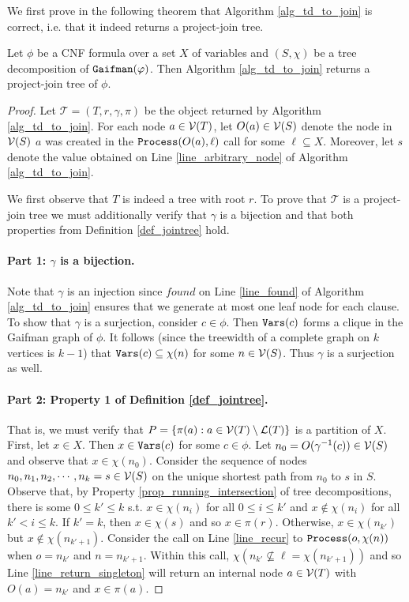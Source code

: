 We first prove in the following theorem that Algorithm \ref{alg_td_to_join} is correct, i.e. that it indeed returns a project-join tree. 
\begin{theorem}
\label{thm_td_to_join_correct}
	Let $\phi$ be a CNF formula over a set $X$ of variables and $(S, \chi)$ be a tree decomposition of $\texttt{\upshape Gaifman}(\varphi)$.
    Then Algorithm \ref{alg_td_to_join} returns a project-join tree of $\phi$.
\end{theorem}
\begin{proof}
Let $\mathcal{T} = (T, r, \gamma, \pi)$ be the object returned by Algorithm \ref{alg_td_to_join}. For each node $a \in \mathcal{V}(T)$, let $O(a) \in \mathcal{V}(S)$ denote the node in $\mathcal{V}(S)$ \st{} $a$ was created in the $\texttt{\upshape Process}(O(a), \ell)$ call for some $\ell \subseteq X$. Moreover, let $s$ denote the value obtained on Line \ref{line_arbitrary_node} of Algorithm \ref{alg_td_to_join}.

We first observe that $T$ is indeed a tree with root $r$. To prove that $\mathcal{T}$ is a project-join tree we must additionally verify that $\gamma$ is a bijection and that both properties from Definition \ref{def_jointree} hold.  

\paragraph{Part 1: $\gamma$ is a bijection.}
    Note that $\gamma$ is an injection since $found$ on Line \ref{line_found} of Algorithm \ref{alg_td_to_join} ensures that we generate at most one leaf node for each clause.
    To show that $\gamma$ is a surjection, consider $c \in \phi$.
    Then $\texttt{\upshape Vars}(c)$ forms a clique in the Gaifman graph of $\phi$.
    It follows (since the treewidth of a complete graph on $k$ vertices is $k-1$) that $\texttt{\upshape Vars}(c) \subseteq \chi(n)$ for some $n \in \mathcal{V}(S)$.
    Thus $\gamma$ is a surjection as well.
    
\paragraph{Part 2: Property 1 of Definition \ref{def_jointree}.} 
    That is, we must verify that $P = \{\pi(a) : a \in \mathcal{V}(T) \setminus \mathcal{L}(T) \}$ is a partition of $X$.
    First, let $x \in X$.
    Then $x \in \texttt{\upshape Vars}(c)$ for some $c \in \phi$. 
    Let $n_0 = O(\gamma^{-1}(c)) \in \mathcal{V}(S)$ and observe that $x \in \chi(n_0)$.
    Consider the sequence of nodes $n_0, n_1, n_2, \cdots, n_k = s \in \mathcal{V}(S)$ on the unique shortest path from $n_0$ to $s$ in $S$.
    Observe that, by Property \ref{prop_running_intersection} of tree decompositions, there is some $0 \leq k' \leq k$ s.t. $x \in \chi(n_i)$ for all $0 \leq i \leq k'$ and $x \not \in \chi(n_i)$ for all $k' < i \leq k$.
    If $k' = k$, then $x \in \chi(s)$ and so $x \in \pi(r)$.
    Otherwise,  $x \in \chi(n_{k'})$ but $x \not\in \chi(n_{k'+1})$.
    Consider the call on Line \ref{line_recur} to $\texttt{\upshape Process}(o, \chi(n))$ when $o = n_{k'}$ and $n = n_{k'+1}$.
    Within this call, $\chi(n_{k'} \not\subseteq \ell = \chi(n_{k'+1}))$ and so Line \ref{line_return_singleton} will return an internal node $a \in \mathcal{V}(T)$ with $O(a) = n_{k'}$ and $x \in \pi(a)$.


\end{proof}

